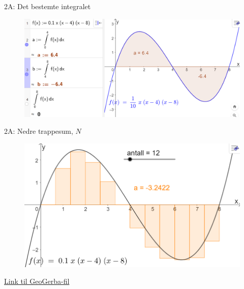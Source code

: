 


\blueheader
\begin{frame}{2A: Det bestemte integralet}
\begin{figure}
    \centering
    \includegraphics[width=\linewidth]{R2-K2A-1.png}
\end{figure}
\end{frame}

\blueheader
\begin{frame}{2A: Nedre trappesum, $N$}
\begin{figure}
    \centering
    \includegraphics[width=0.7\linewidth]{R2-K2A-6.png}
\end{figure}

\href{https://www.geogebra.org/classic/rp6mbmm6}{Link til GeoGerba-fil}
\end{frame}

